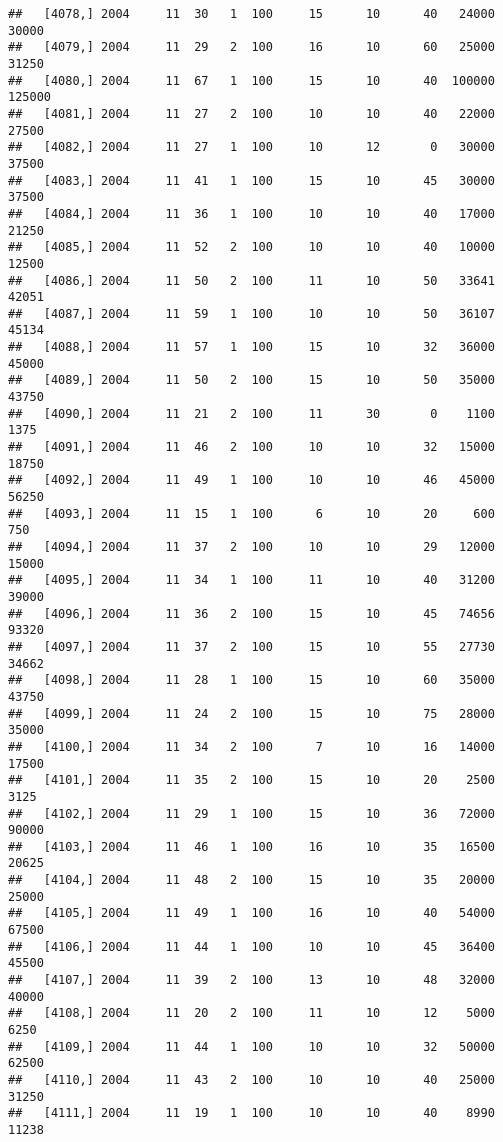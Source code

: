 \documentclass{article}\usepackage[]{graphicx}\usepackage[]{color}
\makeatletter
\newenvironment{kframe}{%
 \def\at@end@of@kframe{}%
 \ifinner\ifhmode%
  \def\at@end@of@kframe{\end{minipage}}%
  \begin{minipage}{\columnwidth}%
 \fi\fi%
 \def\FrameCommand##1{\hskip\@totalleftmargin \hskip-\fboxsep
 \colorbox{shadecolor}{##1}\hskip-\fboxsep
     \hskip-\linewidth \hskip-\@totalleftmargin \hskip\columnwidth}%
 \MakeFramed {\advance\hsize-\width
   \@totalleftmargin\z@ \linewidth\hsize
   \@setminipage}}%
 {\par\unskip\endMakeFramed%
 \at@end@of@kframe}
\newenvironment{knitrout}{}{} %
\makeatother
\begin{document}
\begin{knitrout}
\begin{kframe}
\begin{verbatim}
##   [4078,] 2004     11  30   1  100     15      10      40   24000   30000
##   [4079,] 2004     11  29   2  100     16      10      60   25000   31250
##   [4080,] 2004     11  67   1  100     15      10      40  100000  125000
##   [4081,] 2004     11  27   2  100     10      10      40   22000   27500
##   [4082,] 2004     11  27   1  100     10      12       0   30000   37500
##   [4083,] 2004     11  41   1  100     15      10      45   30000   37500
##   [4084,] 2004     11  36   1  100     10      10      40   17000   21250
##   [4085,] 2004     11  52   2  100     10      10      40   10000   12500
##   [4086,] 2004     11  50   2  100     11      10      50   33641   42051
##   [4087,] 2004     11  59   1  100     10      10      50   36107   45134
##   [4088,] 2004     11  57   1  100     15      10      32   36000   45000
##   [4089,] 2004     11  50   2  100     15      10      50   35000   43750
##   [4090,] 2004     11  21   2  100     11      30       0    1100    1375
##   [4091,] 2004     11  46   2  100     10      10      32   15000   18750
##   [4092,] 2004     11  49   1  100     10      10      46   45000   56250
##   [4093,] 2004     11  15   1  100      6      10      20     600     750
##   [4094,] 2004     11  37   2  100     10      10      29   12000   15000
##   [4095,] 2004     11  34   1  100     11      10      40   31200   39000
##   [4096,] 2004     11  36   2  100     15      10      45   74656   93320
##   [4097,] 2004     11  37   2  100     15      10      55   27730   34662
##   [4098,] 2004     11  28   1  100     15      10      60   35000   43750
##   [4099,] 2004     11  24   2  100     15      10      75   28000   35000
##   [4100,] 2004     11  34   2  100      7      10      16   14000   17500
##   [4101,] 2004     11  35   2  100     15      10      20    2500    3125
##   [4102,] 2004     11  29   1  100     15      10      36   72000   90000
##   [4103,] 2004     11  46   1  100     16      10      35   16500   20625
##   [4104,] 2004     11  48   2  100     15      10      35   20000   25000
##   [4105,] 2004     11  49   1  100     16      10      40   54000   67500
##   [4106,] 2004     11  44   1  100     10      10      45   36400   45500
##   [4107,] 2004     11  39   2  100     13      10      48   32000   40000
##   [4108,] 2004     11  20   2  100     11      10      12    5000    6250
##   [4109,] 2004     11  44   1  100     10      10      32   50000   62500
##   [4110,] 2004     11  43   2  100     10      10      40   25000   31250
##   [4111,] 2004     11  19   1  100     10      10      40    8990   11238

\end{verbatim}
\end{kframe}
\end{knitrout}
\end{document}
